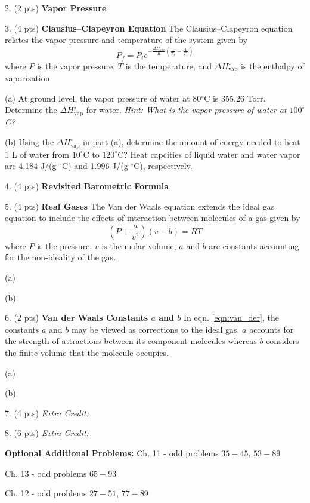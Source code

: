 \documentclass[11pt]{article}
\begin{document}
\pagebreak

2. (2 pts) \textbf{Vapor Pressure}

3. (4 pts) \textbf{Clausius--Clapeyron Equation} The Clausius--Clapeyron equation
relates the vapor pressure and temperature of the system given by
\begin{equation}
  P_f = P_i e^{-\frac{\Delta H^\circ_\text{vap}}{R}(\frac{1}{T_2}-\frac{1}{T_1})}
\end{equation}
where $P$ is the vapor pressure, $T$ is the temperature, and $\Delta H^\circ_\text{vap}$
is the enthalpy of vaporization.

(a) At ground level, the vapor pressure of water at 80$^\circ$C is 355.26 Torr.
Determine the $\Delta H^\circ_\text{vap}$ for water. \textit{Hint: What is the
  vapor pressure of water at $100^\circ$C?}

(b) Using the $\Delta H^\circ_\text{vap}$ in part (a), determine the amount of energy
needed to heat 1 L of water from $10^\circ$C to $120^\circ$C? Heat capcities of liquid
water and water vapor are 4.184 J/(g $^\circ$C) and 1.996 J/(g $^\circ$C), respectively.

\vspace{3in}

4. (4 pts) \textbf{Revisited Barometric Formula}

\vspace{3in}

5. (4 pts) \textbf{Real Gases} The Van der Waals equation extends the ideal gas equation to
include the effects of interaction between molecules of a gas given by
\begin{equation}
  (P+\frac{a}{v^2})(v - b) = RT
  \label{eqn:van_der}
\end{equation}
where $P$ is the pressure, $v$ is the molar volume, $a$ and $b$ are constants accounting
for the non-ideality of the gas.

(a) 

(b) 

6. (2 pts) \textbf{Van der Waals Constants $a$ and $b$} In eqn. \ref{eqn:van_der}, the constants
$a$ and $b$ may be viewed as corrections to the ideal gas. $a$ accounts for the strength
of attractions between its component molecules whereas $b$ considers the finite volume
that the molecule occupies.

(a) 

(b) 

7. (4 pts) \textit{Extra Credit:}

8. (6 pts) \textit{Extra Credit:} 

\vfill
\textbf{Optional Additional Problems:} Ch. 11 - odd problems $35 - 45$,
$53 - 89$

Ch. 13 - odd problems $65 - 93$

Ch. 12 - odd problems $27 - 51$, $77 - 89$
\end{document}
